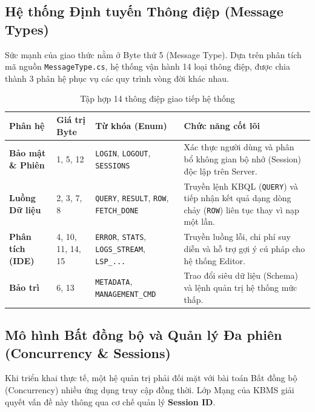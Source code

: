 \documentclass[13pt,a4paper,oneside]{extreport}
\begin{document}
\subsection{Hệ thống Định tuyến Thông điệp (Message Types)}


Sức mạnh của giao thức nằm ở Byte thứ 5 (Message Type). Dựa trên phân tích mã nguồn \texttt{MessageType.\allowbreak{}cs}, hệ thống vận hành 14 loại thông điệp, được chia thành 3 phân hệ phục vụ các quy trình vòng đời khác nhau.



\begin{table}[H]
  \centering\captionsetup{position=below}\small\selectfont
  \begin{tabularx}{\textwidth}{|l|L|L|L|}
  \hline
Phân hệ & Giá trị Byte & Từ khóa (Enum) & Chức năng cốt lõi \\ \hline
\textbf{Bảo mật \& Phiên} & 1, 5, 12 & \texttt{LOGIN}, \texttt{LOGOUT}, \texttt{SESSIONS} & Xác thực người dùng và phân bổ không gian bộ nhớ (Session) độc lập trên Server. \\ \hline
\textbf{Luồng Dữ liệu} & 2, 3, 7, 8 & \texttt{QUERY}, \texttt{RESULT}, \texttt{ROW}, \texttt{FETCH\_DONE} & Truyền lệnh KBQL (\texttt{QUERY}) và tiếp nhận kết quả dạng dòng chảy (\texttt{ROW}) liên tục thay vì nạp một lần. \\ \hline
\textbf{Phân tích (IDE)} & 4, 10, 11, 14, 15 & \texttt{ERROR}, \texttt{STATS}, \texttt{LOGS\_STREAM}, \texttt{LSP\_.\allowbreak{}.\allowbreak{}.\allowbreak{}} & Truyền luồng lỗi, chi phí suy diễn và hỗ trợ gợi ý cú pháp cho hệ thống Editor. \\ \hline
\textbf{Bảo trì} & 6, 13 & \texttt{METADATA}, \texttt{MANAGEMENT\_CMD} & Trao đổi siêu dữ liệu (Schema) và lệnh quản trị hệ thống mức thấp. \\ \hline
  \end{tabularx}
  \caption{Tập hợp 14 thông điệp giao tiếp hệ thống}\label{tbl:tập-hợp-14-thông-điệp-giao-tiếp-hệ-thống}
\end{table}


\subsection{Mô hình Bất đồng bộ và Quản lý Đa phiên (Concurrency \& Sessions)}


Khi triển khai thực tế, một hệ quản trị phải đối mặt với bài toán Bất đồng bộ (Concurrency)  nhiều ứng dụng truy cập đồng thời. Lớp Mạng của KBMS giải quyết vấn đề này thông qua cơ chế quản lý \textbf{Session ID}.
\end{document}
